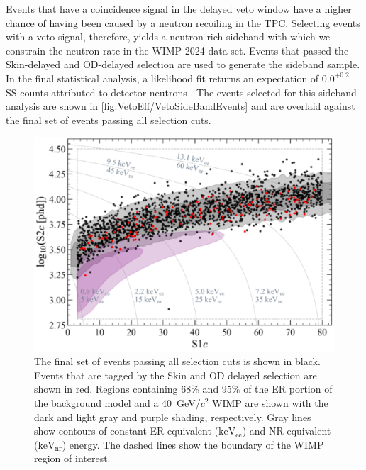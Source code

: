 Events that have a coincidence signal in the delayed veto window have a higher chance of having been caused by a neutron recoiling in the TPC. Selecting events with a veto signal, therefore, yields a neutron-rich sideband with which we constrain the neutron rate in the WIMP 2024 data set.
Events that passed the Skin-delayed and OD-delayed selection are used to generate the sideband sample. In the final statistical analysis, a likelihood fit returns an expectation of $0.0^{+0.2}$ SS counts attributed to detector neutrons \cite{LZCollaboration:2024lux}. The events selected for this sideband analysis are shown in \autoref{fig:VetoEff/VetoSideBandEvents} and are overlaid against the final set of events passing all selection cuts. 

\begin{figure}[h!]
    \centering
    \includegraphics[width=0.7\linewidth]{figures/VetoEfficiency/WS2024VetoSideBandEvents_WIMP40.png}
    \caption[Final set of events passing all selection cuts in the WS2024 dataset with events tagged by the OD and Skin overlaid.]{The final set of events passing all selection cuts is shown in black. Events that are tagged by the Skin and OD delayed selection are shown in red. Regions containing 68\% and 95\% of the ER portion of the background model and a 40~GeV/$c^2$ WIMP are shown with the dark and light gray and purple shading, respectively. Gray lines show contours of constant ER-equivalent ($\text{keV}_\text{ee}$) and NR-equivalent ($\text{keV}_\text{nr}$) energy. The dashed lines show the boundary of the WIMP region of interest.}
    \label{fig:VetoEff/VetoSideBandEvents}
\end{figure}

\pagebreak

